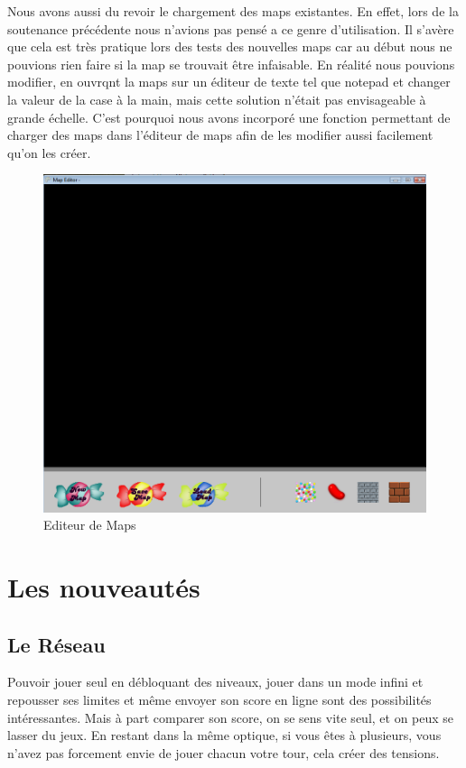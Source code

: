 \documentclass [11pt]{report}
\begin{document}
		\indent Nous avons aussi du revoir le chargement des maps existantes. En effet, lors de la soutenance précédente nous n'avions pas pensé a ce genre d'utilisation. Il s'avère que cela est très pratique lors des tests des nouvelles maps car au début nous ne pouvions rien faire si la map se trouvait \^etre infaisable. En réalité nous pouvions modifier, en ouvrqnt la maps sur un éditeur de texte tel que notepad et changer la valeur de la case \`a la main, mais cette solution n'était pas envisageable \`a grande échelle. C'est pourquoi nous avons incorporé une fonction permettant de charger des maps dans l'éditeur de maps afin de les modifier aussi facilement qu'on les créer.
		\begin{figure}[h]
			\centering
			\includegraphics[width=0.7\linewidth]{./images/Editeur}
			\caption[Editeur de Maps]{Editeur de Maps}
			\label{fig:Editeur}
		\end{figure}
		\vspace{10mm}
		
		
\chapter{Les nouveautés}
	\section{Le Réseau}
		Pouvoir jouer seul en débloquant des niveaux, jouer dans un mode infini et repousser ses limites et même envoyer son score en ligne sont des possibilités intéressantes. Mais à part comparer son score, on se sens vite seul, et on peux se lasser du jeux. En restant dans la même optique, si vous êtes à plusieurs, vous n'avez pas forcement envie de jouer chacun votre tour, cela créer des tensions.\\
		
\end{document}
